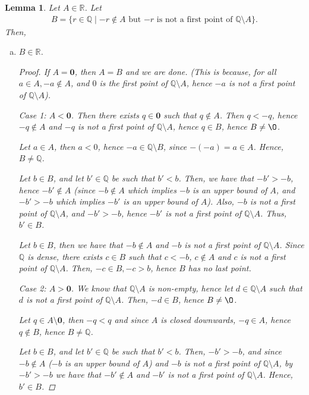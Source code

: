 \documentclass[11pt]{article}
\newcommand{\bbQ}{\mathbb{Q}}
\newcommand{\bbR}{\mathbb{R}}
\renewcommand{\emptyset}{\O}
\newtheorem{lemma}[theorem]{Lemma}
\theoremstyle{definition}
\numberwithin{equation}{subsection}
\begin{document}
\begin{lemma}
	Let $A\in\bbR$. Let
	\begin{align*}
	B= \{r \in \bbQ \mid -r \notin A\text{ but } {-r} \text{ is not a first point of }\bbQ \setminus A\}.
	\end{align*}
	Then,
	\begin{enumerate}[(a)]
		\item $B \in \bbR$.
                
\begin{proof}
If $A = \mathbf{0}$, then $A=B$ and we are done. (This is because, for all $a \in A, -a \notin A$, and $0$ is the first point of $\bbQ \setminus A$, hence $-a$ is not a first point of $\bbQ \setminus A$).

Case 1: $A < \mathbf{0}$. Then there exists $q \in \mathbf{0}$ such that $q \notin A$. Then $q<-q$, hence $-q \notin A$ and $-q$ is not a first point of $\bbQ \setminus A$, hence $q \in B$, hence $B \neq \emptyset$.

Let $a \in A$, then $a<0$, hence $-a \in \bbQ \setminus B$, since $-(-a)=a \in A$. Hence, $B \neq \bbQ$.

Let $b \in B$, and let $b' \in \bbQ$ be such that $b'<b$. Then, we have that $-b'>-b$, hence $-b' \notin A$ (since $-b \notin A$ which implies $-b$ is an upper bound of $A$, and $-b'>-b$  which implies $-b'$ is an upper bound of $A$). Also, $-b$ is not a first point of $\bbQ \setminus A$, and $-b'>-b$, hence $-b'$ is not a first point of $\bbQ \setminus A$. Thus, $b' \in B$.

Let $b \in B$, then we have that $-b \notin A$ and $-b$ is not a first point of $\bbQ \setminus A$. Since $\bbQ$ is dense, there exists $c \in B$ such that $c<-b$, $c \notin A$ and $c$ is not a first point of $\bbQ \setminus A$. Then, $-c\in B, -c>b$, hence $B$ has no last point.

Case 2: $A>\mathbf{0}$. We know that $\bbQ \setminus A$ is non-empty, hence let $d \in \bbQ \setminus A$ such that $d$ is not a first point of $\bbQ \setminus A$. Then, $-d \in B$, hence $B \neq \emptyset$.

Let $q \in A \setminus \mathbf{0}$, then $-q<q$ and since $A$ is closed downwards, $-q \in A$, hence $q \notin B$, hence $B \neq \bbQ$.

Let $b \in B$, and let $b' \in \bbQ$ be such that $b'<b$. Then, $-b'>-b$, and since $-b \notin A$ ($-b$ is an upper bound of $A$) and $-b$ is not a first point of $\bbQ \setminus A$, by $-b'>-b$ we have that $-b' \notin A$ and $-b'$ is not a first point of $\bbQ \setminus A$. Hence, $b' \in B$. 


\end{proof}
\end{enumerate}
\end{lemma}
\end{document}

